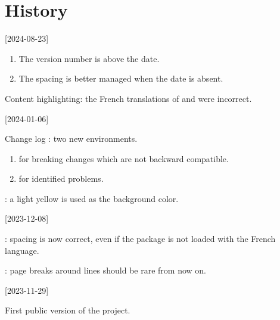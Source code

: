 \section{History}

[2024-08-23]

\begin{tdocupdate}
    \item {}
    \begin{enumerate}
        \item The version number is above the date.

        \item The spacing is better managed when the date is absent.
    \end{enumerate}
\end{tdocupdate}


\begin{tdocfix}
    \item Content highlighting: the French translations of  and  were incorrect.
\end{tdocfix}

\tdocsep




[2024-01-06]

\begin{tdocnew}
    \item Change log : two new environments.
    \begin{enumerate}
        \item {} for breaking changes which are not backward compatible.

        \item {} for identified problems.
    \end{enumerate}

    \item {}: a light yellow is used as the background color.
\end{tdocnew}

\tdocsep




[2023-12-08]

\begin{tdocfix}
    \item {}: spacing is now correct, even if the  package is not loaded with the French language.

    \item {}: page breaks around  lines should be rare from now on.
\end{tdocfix}

\tdocsep




[2023-11-29]

First public version of the project.


